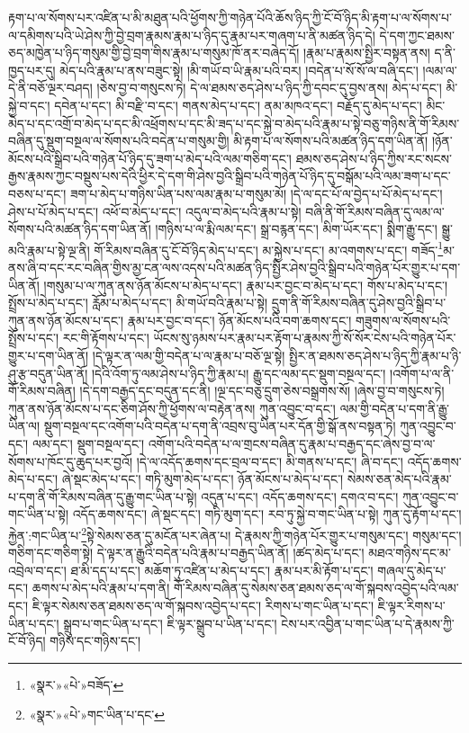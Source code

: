 རྟག་པ་ལ་སོགས་པར་འཛིན་པ་མི་མཐུན་པའི་ཕྱོགས་ཀྱི་གཉེན་པོའི་ཆོས་ཉིད་ཀྱི་ངོ་བོ་ཉིད་མི་རྟག་པ་ལ་སོགས་པ་ལ་དམིགས་པའི་ཡེ་ཤེས་ཀྱི་བྱེ་བྲག་རྣམས་རྣམ་པ་ཉིད་དུ་རྣམ་པར་གཞག་པ་ནི་མཚན་ཉིད་དེ། དེ་དག་ཀྱང་ཐམས་ཅད་མཁྱེན་པ་ཉིད་གསུམ་གྱི་བྱེ་བྲག་གིས་རྣམ་པ་གསུམ་ཁོ་ནར་བཞེད་དོ། །རྣམ་པ་རྣམས་སྤྱིར་བསྟན་ནས། ད་ནི་ཁྱད་པར་དུ། མེད་པའི་རྣམ་པ་ནས་བཟུང་སྟེ། །མི་གཡོ་བ་ཡི་རྣམ་པའི་བར། །བདེན་པ་སོ་སོ་ལ་བཞི་དང་། །ལམ་ལ་དེ་ནི་བཅོ་ལྔར་བཤད། །ཅེས་བྱ་བ་གསུངས་ཏེ། དེ་ལ་ཐམས་ཅད་ཤེས་པ་ཉིད་ཀྱི་དབང་དུ་བྱས་ནས། མེད་པ་དང་། མི་སྐྱེ་བ་དང་། དབེན་པ་དང་། མི་བརྫི་བ་དང་། གནས་མེད་པ་དང་། ནམ་མཁའ་དང་། བརྗོད་དུ་མེད་པ་དང་། མིང་མེད་པ་དང་འགྲོ་བ་མེད་པ་དང་མི་འཕྲོགས་པ་དང་མི་ཟད་པ་དང་སྐྱེ་བ་མེད་པའི་རྣམ་པ་སྟེ་བཅུ་གཉིས་ནི་གོ་རིམས་བཞིན་དུ་སྡུག་བསྔལ་ལ་སོགས་པའི་བདེན་པ་གསུམ་གྱི། མི་རྟག་པ་ལ་སོགས་པའི་མཚན་ཉིད་དག་ཡིན་ནོ། །ཉོན་མོངས་པའི་སྒྲིབ་པའི་གཉེན་པོ་ཉིད་དུ་ཟག་པ་མེད་པའི་ལམ་གཅིག་དང་། ཐམས་ཅད་ཤེས་པ་ཉིད་ཀྱིས་རང་སངས་རྒྱས་རྣམས་ཀྱང་བསྡུས་པས་དེའི་ཕྱིར་དེ་དག་གི་ཤེས་བྱའི་སྒྲིབ་པའི་གཉེན་པོ་ཉིད་དུ་བསྒོམ་པའི་ལམ་ཟག་པ་དང་བཅས་པ་དང་། ཟག་པ་མེད་པ་གཉིས་ཡིན་པས་ལམ་རྣམ་པ་གསུམ་མོ། །དེ་ལ་དང་པོ་ལ་བྱེད་པ་པོ་མེད་པ་དང་། ཤེས་པ་པོ་མེད་པ་དང་། འཕོ་བ་མེད་པ་དང་། འདུལ་བ་མེད་པའི་རྣམ་པ་སྟེ། བཞི་ནི་གོ་རིམས་བཞིན་དུ་ལམ་ལ་སོགས་པའི་མཚན་ཉིད་དག་ཡིན་ནོ། །གཉིས་པ་ལ་རྨི་ལམ་དང་། སྒྲ་བརྙན་དང་། མིག་ཡོར་དང་། སྨིག་རྒྱུ་དང་། སྒྱུ་མའི་རྣམ་པ་སྟེ་ལྔ་ནི། གོ་རིམས་བཞིན་དུ་ངོ་བོ་ཉིད་མེད་པ་དང་། མ་སྐྱེས་པ་དང་། མ་འགགས་པ་དང་། གཟོད་\footnote{«སྣར་»«པེ་»བཟོད་}མ་ནས་ཞི་བ་དང་རང་བཞིན་གྱིས་མྱ་ངན་ལས་འདས་པའི་མཚན་ཉིད་སྤྱིར་ཤེས་བྱའི་སྒྲིབ་པའི་གཉེན་པོར་གྱུར་པ་དག་ཡིན་ནོ། །གསུམ་པ་ལ་ཀུན་ནས་ཉོན་མོངས་པ་མེད་པ་དང་། རྣམ་པར་བྱང་བ་མེད་པ་དང་། གོས་པ་མེད་པ་དང་། སྤྲོས་པ་མེད་པ་དང་། རློམ་པ་མེད་པ་དང་། མི་གཡོ་བའི་རྣམ་པ་སྟེ། དྲུག་ནི་གོ་རིམས་བཞིན་དུ་ཤེས་བྱའི་སྒྲིབ་པ་ཀུན་ནས་ཉོན་མོངས་པ་དང་། རྣམ་པར་བྱང་བ་དང་། ཉོན་མོངས་པའི་བག་ཆགས་དང་། གཟུགས་ལ་སོགས་པའི་སྤྲོས་པ་དང་། རང་གི་རྟོགས་པ་དང་། ཡོངས་སུ་ཉམས་པར་རྣམ་པར་རྟོག་པ་རྣམས་ཀྱི་སོ་སོར་ངེས་པའི་གཉེན་པོར་གྱུར་པ་དག་ཡིན་ནོ། །དེ་ལྟར་ན་ལམ་གྱི་བདེན་པ་ལ་རྣམ་པ་བཅོ་ལྔ་སྟེ། སྤྱིར་ན་ཐམས་ཅད་ཤེས་པ་ཉིད་ཀྱི་རྣམ་པ་ཉི་ཤུ་རྩ་བདུན་ཡིན་ནོ། །དེའི་འོག་ཏུ་ལམ་ཤེས་པ་ཉིད་ཀྱི་རྣམ་པ། རྒྱུ་དང་ལམ་དང་སྡུག་བསྔལ་དང་། །འགོག་པ་ལ་ནི་གོ་རིམས་བཞིན། །དེ་དག་བརྒྱད་དང་བདུན་དང་ནི། །ལྔ་དང་བཅུ་དྲུག་ཅེས་བསྒྲགས་སོ། །ཞེས་བྱ་བ་གསུངས་ཏེ། ཀུན་ནས་ཉོན་མོངས་པ་དང་ཅིག་ཤོས་ཀྱི་ཕྱོགས་ལ་བརྟེན་ནས། ཀུན་འབྱུང་བ་དང་། ལམ་གྱི་བདེན་པ་དག་ནི་རྒྱུ་ཡིན་ལ། སྡུག་བསྔལ་དང་འགོག་པའི་བདེན་པ་དག་ནི་འབྲས་བུ་ཡིན་པར་དོན་གྱི་སྒོ་ནས་བསྟན་ཏེ། ཀུན་འབྱུང་བ་དང་། ལམ་དང་། སྡུག་བསྔལ་དང་། འགོག་པའི་བདེན་པ་ལ་གྲངས་བཞིན་དུ་རྣམ་པ་བརྒྱད་དང་ཞེས་བྱ་བ་ལ་སོགས་པ་ཁོང་དུ་ཆུད་པར་བྱའོ། །དེ་ལ་འདོད་ཆགས་དང་བྲལ་བ་དང་། མི་གནས་པ་དང་། ཞི་བ་དང་། འདོད་ཆགས་མེད་པ་དང་། ཞེ་སྡང་མེད་པ་དང་། གཏི་མུག་མེད་པ་དང་། ཉོན་མོངས་པ་མེད་པ་དང་། སེམས་ཅན་མེད་པའི་རྣམ་པ་དག་ནི་གོ་རིམས་བཞིན་དུ་རྒྱུ་གང་ཡིན་པ་སྟེ། འདུན་པ་དང་། འདོད་ཆགས་དང་། དགའ་བ་དང་། ཀུན་འབྱུང་བ་གང་ཡིན་པ་སྟེ། འདོད་ཆགས་དང་། ཞེ་སྡང་དང་། གཏི་མུག་དང་། རབ་ཏུ་སྐྱེ་བ་གང་ཡིན་པ་སྟེ། ཀུན་དུ་རྟོག་པ་དང་། རྐྱེན་:གང་ཡིན་པ་\footnote{«སྣར་»«པེ་»གང་ཡིན་པ་དང་}སྟེ་སེམས་ཅན་དུ་མངོན་པར་ཞེན་པ། དེ་རྣམས་ཀྱི་གཉེན་པོར་གྱུར་པ་གསུམ་དང་། གསུམ་དང་། གཅིག་དང་གཅིག་སྟེ། དེ་ལྟར་ན་རྒྱུའི་བདེན་པའི་རྣམ་པ་བརྒྱད་ཡིན་ནོ། །ཚད་མེད་པ་དང་། མཐའ་གཉིས་དང་མ་འབྲེལ་བ་དང་། ཐ་མི་དད་པ་དང་། མཆོག་ཏུ་འཛིན་པ་མེད་པ་དང་། རྣམ་པར་མི་རྟོག་པ་དང་། གཞལ་དུ་མེད་པ་དང་། ཆགས་པ་མེད་པའི་རྣམ་པ་དག་ནི། གོ་རིམས་བཞིན་དུ་སེམས་ཅན་ཐམས་ཅད་ལ་གོ་སྐབས་འབྱེད་པའི་ལམ་དང་། ཇི་ལྟར་སེམས་ཅན་ཐམས་ཅད་ལ་གོ་སྐབས་འབྱེད་པ་དང་། རིགས་པ་གང་ཡིན་པ་དང་། ཇི་ལྟར་རིགས་པ་ཡིན་པ་དང་། སྒྲུབ་པ་གང་ཡིན་པ་དང་། ཇི་ལྟར་སྒྲུབ་པ་ཡིན་པ་དང་། ངེས་པར་འབྱིན་པ་གང་ཡིན་པ་དེ་རྣམས་ཀྱི་ངོ་བོ་ཉིད། གཉིས་དང་གཉིས་དང་། 